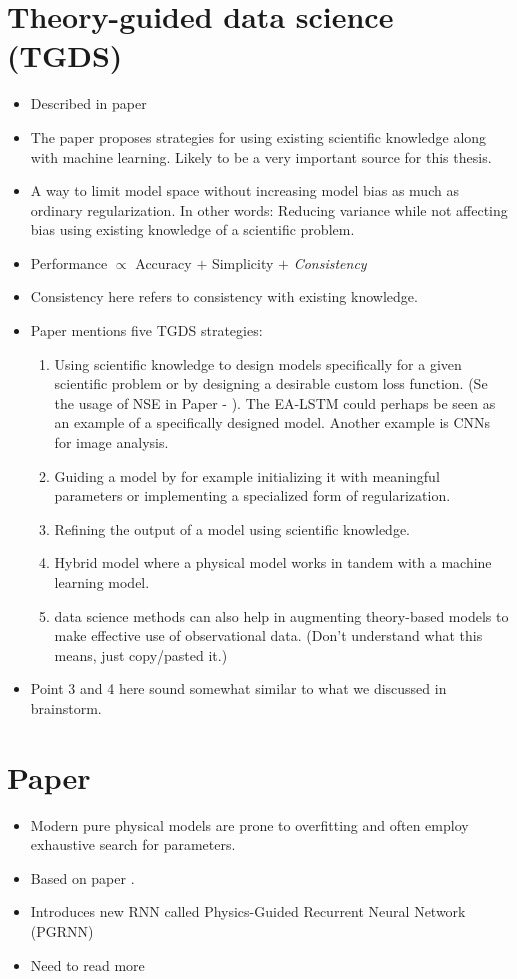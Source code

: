 \documentclass[a4paper,12pt,english]{article}
\begin{document}
\section*{Theory-guided data science (TGDS)}
\begin{itemize}
\item Described in paper \cite{hybrid_paper}
\item The paper proposes strategies for using existing scientific knowledge along with machine learning. Likely to be a very important source for this thesis.
\item A way to limit model space without increasing model bias as much as ordinary regularization. In other words: Reducing variance while not affecting bias using existing knowledge of a scientific problem.
\item Performance $\propto$ Accuracy $+$ Simplicity $+$ \textit{Consistency}
\item Consistency here refers to consistency with existing knowledge.
\item Paper mentions five TGDS strategies:
\begin{enumerate}
\item Using scientific knowledge to design models specifically for a given scientific problem or by designing a desirable custom loss function. (Se the usage of NSE in Paper \cite{lstm_first_paper} - \cite{lstm_third_paper}). The EA-LSTM could perhaps be seen as an example of a specifically designed model. Another example is CNNs for image analysis.
\item Guiding a model by for example initializing it with meaningful parameters or implementing a specialized form of regularization.
\item Refining the output of a model using scientific knowledge.
\item Hybrid model where a physical model works in tandem with a machine learning model. 
\item data science methods can also help in augmenting theory-based models to make effective use of observational data. (Don't understand what this means, just copy/pasted it.)
\end{enumerate}
\item Point 3 and 4 here sound somewhat similar to what we discussed in brainstorm.
\end{itemize}

\section*{Paper \cite{lake}}
\begin{itemize}
\item Modern pure physical models are prone to overfitting and often employ exhaustive search for parameters.
\item Based on paper \cite{hybrid_paper}.
\item Introduces new RNN called Physics-Guided Recurrent Neural Network (PGRNN)
\item Need to read more
\end{itemize}
\end{document}
